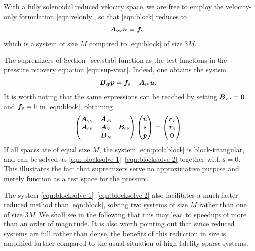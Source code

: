 \documentclass[onecolumn, twoside, a4paper, 11pt]{article}
\begin{document}
With a fully solenoidal reduced velocity space, we are free to employ the
velocity-only formulation \eqref{eqn:velonly}, so that \eqref{eqn:block} reduces
to
\begin{equation}
  \bm A_\textsc{vv} \bm u = \bm f_\textsc{v}.
  \label{eqn:blocksolve-1}
\end{equation}
which is a system of size $M$ compared to \eqref{eqn:block} of size $3M$.

The supremizers of Section~\ref{sec:stab} function as the test functions in the
pressure recovery equation \eqref{eqn:sup-vvar}. Indeed, one obtains the system
\begin{equation}
  \bm B_\textsc{sp} \bm p = \bm f_\textsc{s} - \bm A_\textsc{sv} \bm u.
  \label{eqn:blocksolve-2}
\end{equation}
%
It is worth noting that the same expressions can be reached by setting $\bm B_\textsc{vp} = 0$ and
$\bm f_\textsc{p} = 0$ in \eqref{eqn:block}, obtaining
\begin{equation}
  \label{eqn:piolablock}
  \begin{pmatrix}
    \bm A_\textsc{vv} & \bm A_\textsc{vs} & \\
    \bm A_\textsc{sv} & \bm A_\textsc{ss} & \bm B_\textsc{sp} \\
    & \bm B_\textsc{ps} & \end{pmatrix}
  \begin{pmatrix} \bm u \\ \bm s \\ \bm p \end{pmatrix}
  = \begin{pmatrix} \bm r_\textsc{v} \\ \bm r_\textsc{s} \\ \bm 0 \end{pmatrix}
\end{equation}
If all spaces are of equal size $M$, the system \eqref{eqn:piolablock} is
block-triangular, and can be solved as
\eqref{eqn:blocksolve-1}--\eqref{eqn:blocksolve-2} together with $\bm s = 0$.
This illustrates the fact that supremizers serve no approximative purpose and
merely function as a test space for the pressure.

The system \eqref{eqn:blocksolve-1}--\eqref{eqn:blocksolve-2} also facilitates a
much faster reduced method than \eqref{eqn:block}, solving two systems of size
$M$ rather than one of size $3M$. We shall see in the following that this may
lead to speedups of more than an order of magnitude. It is also worth pointing out
that since reduced systems are full rather than dense, the benefits of this
reduction in size is amplified further compared to the usual situation of high-fidelity
sparse systems.
\end{document}
